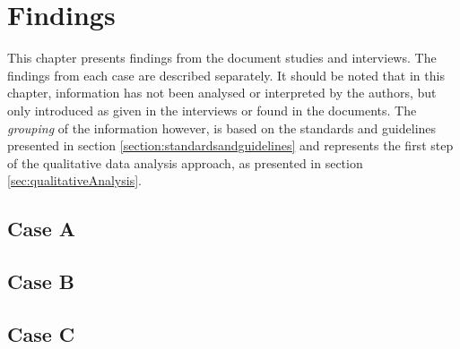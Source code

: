 \chapter{Findings}
This chapter presents findings from the document studies and interviews. The findings from each case are described separately. It should be noted that in this chapter, information has not been analysed or interpreted by the authors, but only introduced as given in the interviews or found in the documents. The \textit{grouping} of the information however, is based on the standards and guidelines presented in section \ref{section:standardsandguidelines} and represents the first step of the qualitative data analysis approach, as presented in section \ref{sec:qualitativeAnalysis}. 

\section{Case A}


\section{Case B}


\section{Case C}
